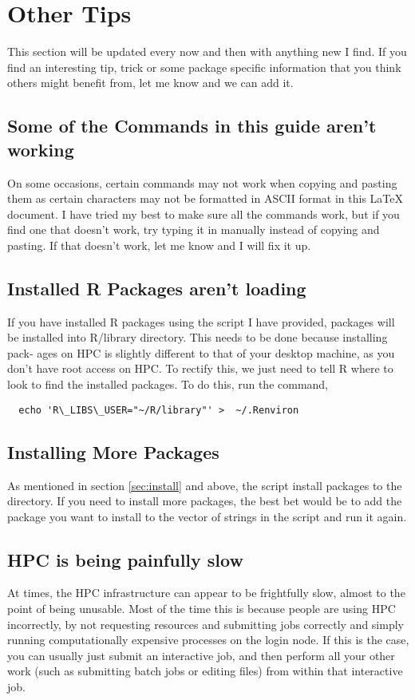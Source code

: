 \section{Other Tips}
This section will be updated every now and then with anything new I find. If you find an interesting tip, trick or some package specific information that you think others might benefit from, let me know and we can add it.
%
%
\subsection{ Some of the Commands in this guide aren't working \frownie}
On some occasions, certain commands may not work when copying and pasting them as certain characters may not be formatted in ASCII format in this LaTeX document. I have tried my best to make sure all the commands work, but if you find one that doesn’t work, try typing it in manually instead of copying and pasting. If that doesn’t work, let me know and I will fix it up.
%
%
\subsection{Installed R Packages aren't loading}
%
%
If you have installed R packages using the script I have provided, packages will be installed into R/library directory. This needs to be done because installing pack- ages on HPC is slightly different to that of your desktop machine, as you don’t have root access on HPC. To rectify this, we just need to tell R where to look to find the installed packages. To do this, run the command,
%
\begin{verbatim}
  echo 'R\_LIBS\_USER="~/R/library"' >  ~/.Renviron
\end{verbatim}
%
%
%
\subsection{Installing More Packages}
%
%
As mentioned in section \ref{sec:install} and above, the  script install packages to the  directory. If you need to install more packages, the best bet would be to add the package you want to install to the vector of strings in the  script and run it again.
%
%
%
%
\subsection{HPC is being painfully slow \frownie}
%
%
At times, the HPC infrastructure can appear to be frightfully slow, almost to the point of being unusable. Most of the time this is because people are using HPC incorrectly, by not requesting resources and submitting jobs correctly and simply running computationally expensive processes on the login node. If this is the case, you can usually just submit an interactive job, and then perform all your other work (such as submitting batch jobs or editing files) from within that interactive job.
%
%
%
%
